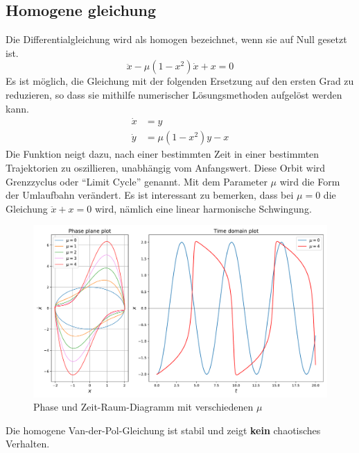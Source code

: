 \subsection{Homogene gleichung
\label{vanderpol:subsection:homogene}}
Die Differentialgleichung wird als homogen bezeichnet, wenn sie auf Null gesetzt ist.
\begin{equation}
	\ddot{x} - \mu \left(1-x^{2}\right)\dot{x}+x = 0
\label{vanderpol:equations:homogene}
\end{equation}
Es ist möglich, die Gleichung mit der folgenden Ersetzung auf den ersten Grad zu reduzieren, so dass sie mithilfe numerischer Lösungsmethoden aufgelöst werden kann.
\begin{align}
	\dot{x} &= y  \label{vanderpol:equations:homogene_1} \\
	\dot{y} &= \mu \left(1-x^{2}\right)y - x 
	\label{vanderpol:equations:homogene_2}
\end{align}
Die Funktion neigt dazu, nach einer bestimmten Zeit in einer bestimmten Trajektorien zu oszillieren, unabhängig vom Anfangswert. Diese Orbit wird Grenzzyclus oder ``Limit Cycle'' genannt. Mit dem Parameter $\mu$ wird die Form der Umlaufbahn verändert. Es ist interessant zu bemerken, dass bei $\mu = 0$ die Gleichung $\ddot{x} + x = 0$ wird, nämlich eine linear harmonische Schwingung.
\begin{figure}[ht]
	\centering
	\includegraphics[width=\textwidth]{papers/vanderpol/figures/homogene_plot.pdf}
	\caption{Phase und Zeit-Raum-Diagramm mit verschiedenen $\mu$\label{vanderpol:figures:homogene}}
\end{figure}

\noindent Die homogene Van-der-Pol-Gleichung ist stabil und zeigt \textbf{kein} chaotisches Verhalten.
